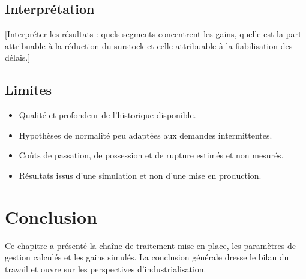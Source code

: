 \subsection{Interprétation}

\hspace{1cm}[Interpréter les résultats : quels segments concentrent les gains,
quelle est la part attribuable à la réduction du surstock et celle attribuable
à la fiabilisation des délais.]

\subsection{Limites}

\begin{itemize}
  \item Qualité et profondeur de l'historique disponible.
  \item Hypothèses de normalité peu adaptées aux demandes intermittentes.
  \item Coûts de passation, de possession et de rupture estimés et non mesurés.
  \item Résultats issus d'une simulation et non d'une mise en production.
\end{itemize}

\section*{Conclusion}

Ce chapitre a présenté la chaîne de traitement mise en place, les paramètres de
gestion calculés et les gains simulés. La conclusion générale dresse le bilan du
travail et ouvre sur les perspectives d'industrialisation.
